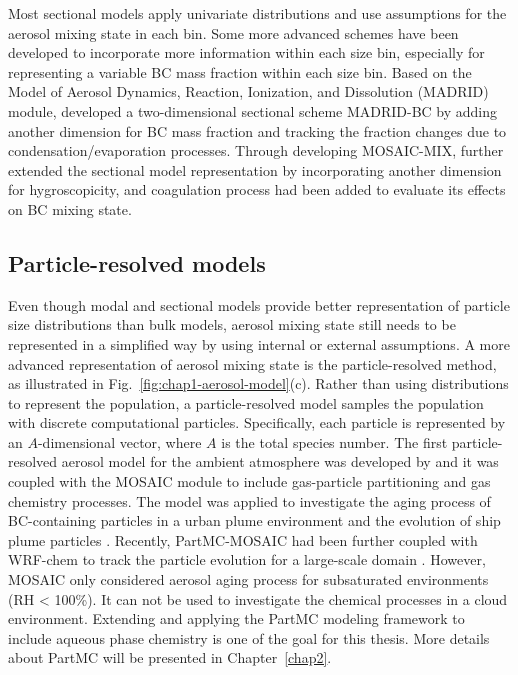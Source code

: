 \documentclass[edeposit,fullpage]{uiucthesis2009}
\begin{document}
Most sectional models apply univariate distributions and use
assumptions for the aerosol mixing state in each bin. Some more
advanced schemes have been developed to incorporate more information
within each size bin, especially for representing a variable BC mass
fraction within each size bin. Based on the Model of Aerosol Dynamics,
Reaction, Ionization, and Dissolution (MADRID) module,
\citet{oshima2009aging} developed a two-dimensional sectional scheme
MADRID-BC by adding another dimension for BC mass fraction and
tracking the fraction changes due to condensation/evaporation
processes. Through developing MOSAIC-MIX, \citet{ching2016three}
further extended the sectional model representation by incorporating
another dimension for hygroscopicity, and coagulation process had been
added to evaluate its effects on BC mixing state.

\subsection{Particle-resolved models}
Even though modal and sectional models provide better representation
of particle size distributions than bulk models, aerosol mixing state
still needs to be represented in a simplified way by using internal or
external assumptions. A more advanced representation of aerosol mixing
state is the particle-resolved method, as illustrated in
Fig.~\ref{fig:chap1-aerosol-model}(c). Rather than using distributions
to represent the population, a particle-resolved model samples the
population with discrete computational particles. Specifically, each
particle is represented by an $A$-dimensional vector, where $A$ is the
total species number. The first particle-resolved aerosol model for
the ambient atmosphere was developed by \citet{Riemer2009} and it was
coupled with the MOSAIC module to include gas-particle partitioning
and gas chemistry processes. The model was applied to investigate the
aging process of BC-containing particles in a urban plume environment
and the evolution of ship plume particles \citep{tian2014modeling,
  Ching2016}. Recently, PartMC-MOSAIC had been further coupled with
WRF-chem to track the particle evolution for a large-scale domain
\citep{curtis2017single}. However, MOSAIC only considered aerosol
aging process for subsaturated environments (RH < 100\%). It can not
be used to investigate the chemical processes in a cloud
environment. Extending and applying the PartMC modeling framework to
include aqueous phase chemistry is one of the goal for this
thesis. More details about PartMC will be presented in
Chapter~\ref{chap2}.
\end{document}

